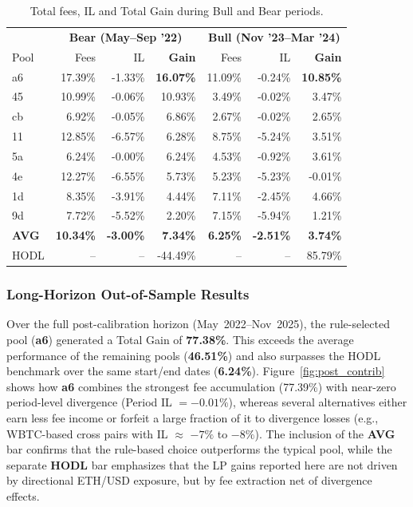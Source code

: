 \documentclass[journal]{IEEEtran}
\begin{document}
\begin{table}[h] \centering \scriptsize \begin{tabular}{lrrr|rrr} \toprule & \multicolumn{3}{c}{\textbf{Bear (May--Sep '22)}} & \multicolumn{3}{c}{\textbf{Bull (Nov '23--Mar '24)}} \\ Pool & Fees & IL & \textbf{Gain} & Fees & IL & \textbf{Gain} \\ \midrule \rowcolor{gray!15} a6 & 17.39\% & -1.33\% & \textbf{16.07\%} & 11.09\% & -0.24\% & \textbf{10.85\%} \\ 45 & 10.99\% & -0.06\% & 10.93\% & 3.49\% & -0.02\% & 3.47\% \\ cb & 6.92\% & -0.05\% & 6.86\% & 2.67\% & -0.02\% & 2.65\% \\ 11 & 12.85\% & -6.57\% & 6.28\% & 8.75\% & -5.24\% & 3.51\% \\ 5a & 6.24\% & -0.00\% & 6.24\% & 4.53\% & -0.92\% & 3.61\% \\ 4e & 12.27\% & -6.55\% & 5.73\% & 5.23\% & -5.23\% & -0.01\% \\ 1d & 8.35\% & -3.91\% & 4.44\% & 7.11\% & -2.45\% & 4.66\% \\ 9d & 7.72\% & -5.52\% & 2.20\% & 7.15\% & -5.94\% & 1.21\% \\ \midrule \textbf{AVG} & \textbf{10.34\%} & \textbf{-3.00\%} & \textbf{7.34\%} & \textbf{6.25\%} & \textbf{-2.51\%} & \textbf{3.74\%} \\ HODL & -- & -- & -44.49\% & -- & -- & 85.79\% \\ \bottomrule \end{tabular} \caption{Total fees, IL and Total Gain during Bull and Bear periods.} \label{tab:case_bear_bull} \end{table}

\subsubsection{Long-Horizon Out-of-Sample Results}
Over the full post-calibration horizon (May~2022--Nov~2025), the rule-selected pool (\textbf{a6}) generated a Total Gain of \textbf{77.38\%}. This exceeds the average performance of the remaining pools (\textbf{46.51\%}) and also surpasses the HODL benchmark over the same start/end dates (\textbf{6.24\%}). Figure~\ref{fig:post_contrib} shows how \textbf{a6} combines the strongest fee accumulation (77.39\%) with near-zero period-level divergence (Period IL $=-0.01\%$), whereas several alternatives either earn less fee income or forfeit a large fraction of it to divergence losses (e.g., WBTC-based cross pairs with IL $\approx$ $-7\%$ to $-8\%$). The inclusion of the \textbf{AVG} bar confirms that the rule-based choice outperforms the typical pool, while the separate \textbf{HODL} bar emphasizes that the LP gains reported here are not driven by directional ETH/USD exposure, but by fee extraction net of divergence effects.
\end{document}
